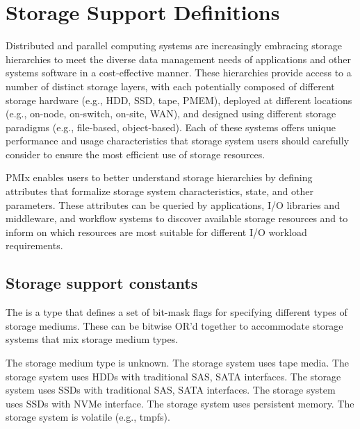 \chapter{Storage Support Definitions}
\label{chap:api_storage}

\provisionalMarker{}

Distributed and parallel computing systems are increasingly embracing storage hierarchies to meet the diverse data management needs of applications and other systems software in a cost-effective manner.
These hierarchies provide access to a number of distinct storage layers, with each potentially composed of different storage hardware (e.g., HDD, SSD, tape, PMEM), deployed at different locations (e.g., on-node, on-switch, on-site, WAN), and designed using different storage paradigms (e.g., file-based, object-based).
Each of these systems offers unique performance and usage characteristics that storage system users should carefully consider to ensure the most efficient use of storage resources.

PMIx enables users to better understand storage hierarchies by defining attributes that formalize storage system characteristics, state, and other parameters.
These attributes can be queried by applications, I/O libraries and middleware, and workflow systems to discover available storage resources and to inform on which resources are most suitable for different I/O workload requirements.

\section{Storage support constants}

\provisionalMarker{}

The  is a  type that defines a set of bit-mask flags for specifying different types of storage mediums. These can be bitwise OR'd together to accommodate storage systems that mix storage medium types.

\begin{constantdesc}
%
The storage medium type is unknown.
%
The storage system uses tape media.
%
The storage system uses HDDs with traditional SAS, SATA interfaces.
%
The storage system uses SSDs with traditional SAS, SATA interfaces.
%
The storage system uses SSDs with NVMe interface.
%
The storage system uses persistent memory.
%
The storage system is volatile (e.g., tmpfs).
%
\end{constantdesc}

